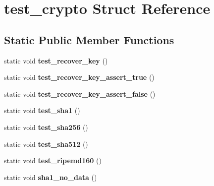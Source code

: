 \hypertarget{structtest__crypto}{}\section{test\+\_\+crypto Struct Reference}
\label{structtest__crypto}
\subsection*{Static Public Member Functions}
\begin{DoxyCompactItemize}
\item 
\mbox{\label{structtest__crypto_a79dfeff4e52b713d2d84378c7aa2e93a}} 
static void {\bfseries test\+\_\+recover\+\_\+key} ()
\item 
\mbox{\label{structtest__crypto_a724d9bb43dbd5ab37788eccbbf942116}} 
static void {\bfseries test\+\_\+recover\+\_\+key\+\_\+assert\+\_\+true} ()
\item 
\mbox{\label{structtest__crypto_a78d286c18b61ee990b280165e1292260}} 
static void {\bfseries test\+\_\+recover\+\_\+key\+\_\+assert\+\_\+false} ()
\item 
\mbox{\label{structtest__crypto_a8292161df2f12da7456309d47482064c}} 
static void {\bfseries test\+\_\+sha1} ()
\item 
\mbox{\label{structtest__crypto_abb5b20c98e50ae837e33e1712cc7d1e1}} 
static void {\bfseries test\+\_\+sha256} ()
\item 
\mbox{\label{structtest__crypto_ad2d7594e2e343c38a2831d4f6534a95f}} 
static void {\bfseries test\+\_\+sha512} ()
\item 
\mbox{\label{structtest__crypto_a34a7abf89e53299af702d5265d9cb04b}} 
static void {\bfseries test\+\_\+ripemd160} ()
\item 
\mbox{\label{structtest__crypto_a6452b7fee432f64cadf4f4c6ed949b8f}} 
static void {\bfseries sha1\+\_\+no\+\_\+data} ()
\item 
\mbox{\label{structtest__crypto_a01ed28f7bf7c32a313f25a2049b5335b}} 

\end{DoxyCompactItemize}
